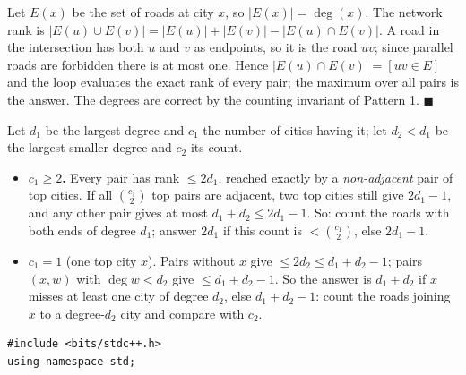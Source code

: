 \begin{invariantbox}
Let $E(x)$ be the set of roads at city $x$, so $|E(x)| = \deg(x)$. The network rank is $|E(u) \cup E(v)| = |E(u)| + |E(v)| - |E(u) \cap E(v)|$. A road in the intersection has both $u$ and $v$ as endpoints, so it is the road $uv$; since parallel roads are forbidden there is at most one. Hence $|E(u) \cap E(v)| = [uv \in E]$ and the loop evaluates the exact rank of every pair; the maximum over all pairs is the answer. The degrees are correct by the counting invariant of Pattern 1. \hfill$\blacksquare$
\end{invariantbox}

\begin{alternativebox}
Let $d_1$ be the largest degree and $c_1$ the number of cities having it; let $d_2 < d_1$ be the largest smaller degree and $c_2$ its count.
\begin{itemize}[leftmargin=*]
    \item \textbf{$c_1 \ge 2$.} Every pair has rank $\le 2d_1$, reached exactly by a \emph{non-adjacent} pair of top cities. If all $\binom{c_1}{2}$ top pairs are adjacent, two top cities still give $2d_1 - 1$, and any other pair gives at most $d_1 + d_2 \le 2d_1 - 1$. So: count the roads with both ends of degree $d_1$; answer $2d_1$ if this count is $< \binom{c_1}{2}$, else $2d_1 - 1$.
    \item \textbf{$c_1 = 1$} (one top city $x$). Pairs without $x$ give $\le 2d_2 \le d_1 + d_2 - 1$; pairs $(x, w)$ with $\deg w < d_2$ give $\le d_1 + d_2 - 1$. So the answer is $d_1 + d_2$ if $x$ misses at least one city of degree $d_2$, else $d_1 + d_2 - 1$: count the roads joining $x$ to a degree-$d_2$ city and compare with $c_2$.
\end{itemize}
\begin{lstlisting}[style=cpp]
#include <bits/stdc++.h>
using namespace std;


\end{lstlisting}
\end{alternativebox}
